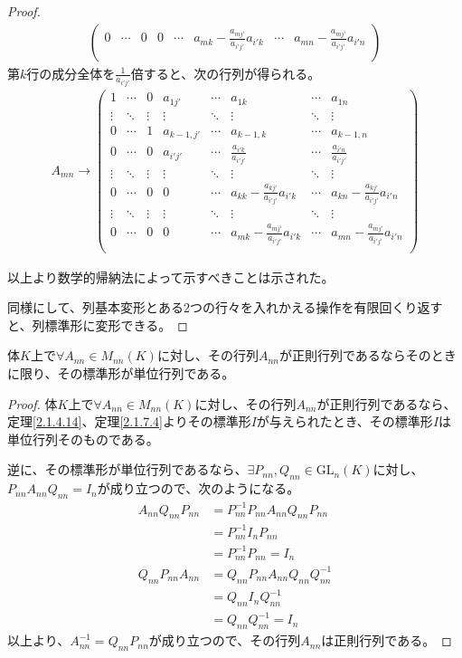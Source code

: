 \documentclass[dvipdfmx]{jsarticle}
\begin{document}
\begin{proof}
\begin{align*}
\begin{pmatrix}
0 & \cdots & 0 & 0 & \cdots & a_{mk} - \frac{a_{mj'}}{a_{i'j'}}a_{i'k} & \cdots & a_{mn} - \frac{a_{mj'}}{a_{i'j'}}a_{i'n} \\
\end{pmatrix}
\end{align*}
第$k$行の成分全体を$\frac{1}{a_{i'j'}}$倍すると、次の行列が得られる。
\begin{align*}
A_{mn} \rightarrow \begin{pmatrix}
1 & \cdots & 0 & a_{1j'} & \cdots & a_{1k} & \cdots & a_{1n} \\
 \vdots & \ddots & \vdots & \vdots & \ddots & \vdots & \ddots & \vdots \\
0 & \cdots & 1 & a_{k - 1,j'} & \cdots & a_{k - 1,k} & \cdots & a_{k - 1,n} \\
0 & \cdots & 0 & a_{i'j'} & \cdots & \frac{a_{i'k}}{a_{i'j'}} & \cdots & \frac{a_{i'n}}{a_{i'j'}} \\
 \vdots & \ddots & \vdots & \vdots & \ddots & \vdots & \ddots & \vdots \\
0 & \cdots & 0 & 0 & \cdots & a_{kk} - \frac{a_{kj'}}{a_{i'j'}}a_{i'k} & \cdots & a_{kn} - \frac{a_{kj'}}{a_{i'j'}}a_{i'n} \\
 \vdots & \ddots & \vdots & \vdots & \ddots & \vdots & \ddots & \vdots \\
0 & \cdots & 0 & 0 & \cdots & a_{mk} - \frac{a_{mj'}}{a_{i'j'}}a_{i'k} & \cdots & a_{mn} - \frac{a_{mj'}}{a_{i'j'}}a_{i'n} \\
\end{pmatrix}
\end{align*}\par
以上より数学的帰納法によって示すべきことは示された。\par
同様にして、列基本変形とある2つの行々を入れかえる操作を有限回くり返すと、列標準形に変形できる。
\end{proof}
\begin{thm}\label{2.1.7.6}
体$K$上で$\forall A_{nn} \in M_{nn}(K)$に対し、その行列$A_{nn}$が正則行列であるならそのときに限り、その標準形が単位行列である。
\end{thm}
\begin{proof}
体$K$上で$\forall A_{nn} \in M_{nn}(K)$に対し、その行列$A_{nn}$が正則行列であるなら、定理\ref{2.1.4.14}、定理\ref{2.1.7.4}よりその標準形$I$が与えられたとき、その標準形$I$は単位行列そのものである。\par
逆に、その標準形が単位行列であるなら、$\exists P_{nn},Q_{nn} \in {\mathrm{GL}}_{n}(K)$に対し、$P_{nn}A_{nn}Q_{nn} = I_{n}$が成り立つので、次のようになる。
\begin{align*}
A_{nn}Q_{nn}P_{nn} &= P_{nn}^{- 1}P_{nn}A_{nn}Q_{nn}P_{nn}\\
&= P_{nn}^{- 1}I_{n}P_{nn}\\
&= P_{nn}^{- 1}P_{nn} = I_{n}\\
Q_{nn}P_{nn}A_{nn} &= Q_{nn}P_{nn}A_{nn}Q_{nn}Q_{nn}^{- 1}\\
&= Q_{nn}I_{n}Q_{nn}^{- 1}\\
&= Q_{nn}Q_{nn}^{- 1} = I_{n}
\end{align*}
以上より、$A_{nn}^{- 1} = Q_{nn}P_{nn}$が成り立つので、その行列$A_{nn}$は正則行列である。
\end{proof}
\end{document}
